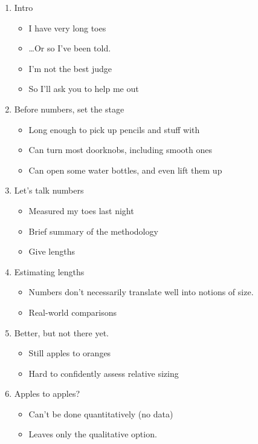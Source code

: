 \documentclass{fkpset}
\begin{document}
\begin{solution}[Outline.]
  \begin{enumerate}
    \item Intro
      \begin{itemize}
        \item I have very long toes
        \item \ldots Or so I've been told.
        \item I'm not the best judge
        \item So I'll ask you to help me out
      \end{itemize}
    \item Before numbers, set the stage
      \begin{itemize}
        \item Long enough to pick up pencils and stuff with
        \item Can turn most doorknobs, including smooth ones
        \item Can open some water bottles, and even lift them up
      \end{itemize}
    \item Let's talk numbers
      \begin{itemize}
        \item Measured my toes last night
        \item Brief summary of the methodology
        \item Give lengths
      \end{itemize}
    \item Estimating lengths
      \begin{itemize}
        \item Numbers don't necessarily translate well into notions of size.
        \item Real-world comparisons
      \end{itemize}
    \item Better, but not there yet.
      \begin{itemize}
        \item Still apples to oranges
        \item Hard to confidently assess relative sizing
      \end{itemize}
    \item Apples to apples?
      \begin{itemize}
        \item Can't be done quantitatively (no data)
        \item Leaves only the qualitative option.
      \end{itemize}
  \end{enumerate}

\end{solution}
\end{document}
